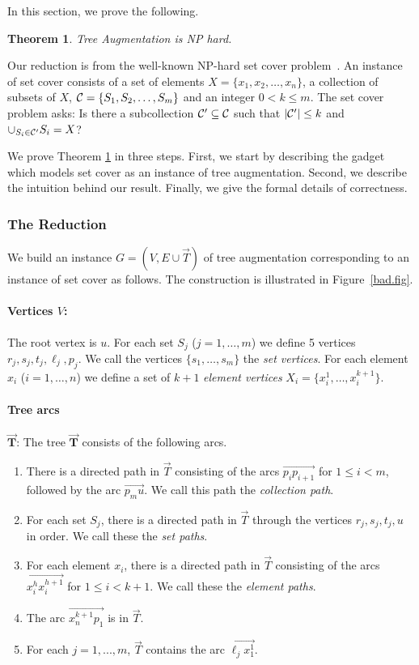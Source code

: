 \documentclass{article}
\newtheorem{theorem}{Theorem}
\newcommand{\ora}{\overrightarrow}
\begin{document}
In this section, we prove the following.
\begin{theorem}
\label{thm:hard}
{\sc Tree Augmentation} is NP hard.
\end{theorem}
Our reduction is from the well-known NP-hard {\sc set cover} problem~\cite{GJ79}. 
An instance of {\sc set cover} consists of a set of elements $X=\{x_1,x_2,\ldots , x_n\}$, a
collection of subsets of $X$, ${\cal C}=\{S_1,S_2,\ldots , S_m\}$ and an
integer $0<k\le m$.  The {\sc set cover} problem asks: Is there a
subcollection ${\cal C}'\subseteq {\cal C}$ such that $|{\cal C}'|\le k$ and $\cup_{S_i\in
  {\cal C}'} S_i = X$?

We prove Theorem \ref{thm:hard} in three steps. 
First, we start by describing the gadget which models {\sc set cover} as an instance of {\sc tree augmentation}.
Second, we describe the intuition behind our result. 
Finally, we give the formal details of correctness.


\subsubsection*{The Reduction}  
We build an instance $G=(V,E\cup \overrightarrow T)$ of {\sc tree augmentation}
corresponding to an instance of {\sc set cover} as follows.  The construction is
illustrated in Figure~\ref{bad.fig}.

\paragraph{Vertices $V$:} The root vertex is $u$.  For each set $S_j$ ($j =
  1, \ldots, m$) we define 5 vertices $r_j, s_j, t_j, \ell_j, p_j$.
  We call the vertices $\{s_1, \ldots, s_m\}$ the {\em set vertices}.
  For each element $x_i$ ($i = 1, \ldots, n$) we
  define a set of $k+1$ {\em element vertices} $X_i = \{x_i^1, \ldots, x_i^{k+1}\}$.
\paragraph{Tree arcs} $\mathbf{\ora{T}}$: 
The tree $\mathbf{\ora{T}}$ consists of the following arcs.
  \begin{enumerate}
	  \item There is a directed path in $\ora{T}$ consisting of the arcs $\overrightarrow{p_ip_{i+1}}$
		  for $1\le i < m$, followed by the arc $\overrightarrow{p_mu}$.
		  We call this path the {\em collection path}.
	  \item For each set $S_j$, there is a directed path in $\ora{T}$ through the vertices
    $r_j,s_j,t_j,u$ in order.  We call these the {\em set paths}.
  \item For each element $x_i$, there is a directed path in $\ora{T}$ consisting of
	  the arcs $\overrightarrow{x_i^h x_i^{h+1}}$ for $1\le i<k+1$.
    We call these the {\em element paths}.
  \item The arc $\overrightarrow{x_n^{k+1}p_1}$ is in $\ora{T}$.
  \item For each $j = 1, ..., m$, $\ora{T}$ contains the arc $\overrightarrow{\ell_j x_1^1}.$
  \end{enumerate}
\end{document}

